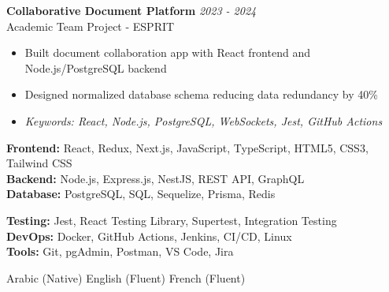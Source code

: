 \documentclass[11pt,a4paper]{article}
\begin{document}

\textbf{Collaborative Document Platform} \hfill \textit{2023 - 2024}\\[-2pt]
Academic Team Project - ESPRIT\\[-5pt]
\begin{itemize}[leftmargin=8pt,itemsep=1pt,topsep=2pt]
  \item Built document collaboration app with React frontend and Node.js/PostgreSQL backend
  \item Designed normalized database schema reducing data redundancy by 40\%
  \item[] \textit{\footnotesize Keywords: React, Node.js, PostgreSQL, WebSockets, Jest, GitHub Actions}
\end{itemize}\vspace{3pt}

{\small
\begin{minipage}[t]{0.48\textwidth}
  \textbf{Frontend:} React, Redux, Next.js, JavaScript, TypeScript, HTML5, CSS3, Tailwind CSS\\[1.5pt]
  \textbf{Backend:} Node.js, Express.js, NestJS, REST API, GraphQL\\[1.5pt]
  \textbf{Database:} PostgreSQL, SQL, Sequelize, Prisma, Redis
\end{minipage}
\hfill
\begin{minipage}[t]{0.48\textwidth}
  \textbf{Testing:} Jest, React Testing Library, Supertest, Integration Testing\\[1.5pt]
  \textbf{DevOps:} Docker, GitHub Actions, Jenkins, CI/CD, Linux\\[1.5pt]
  \textbf{Tools:} Git, pgAdmin, Postman, VS Code, Jira
\end{minipage}
}

Arabic (Native) \textbar{} English (Fluent) \textbar{} French (Fluent)
\end{document}
